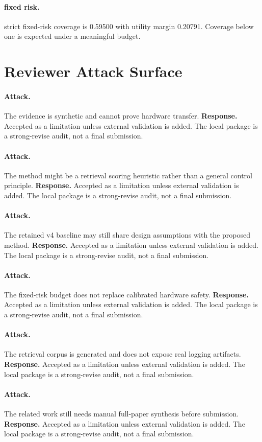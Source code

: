 \documentclass{article}
\begin{document}
\paragraph{fixed risk.} strict fixed-risk coverage is 0.59500 with utility margin 0.20791. Coverage below one is expected under a meaningful budget.
\clearpage
\section{Reviewer Attack Surface}
\paragraph{Attack.} The evidence is synthetic and cannot prove hardware transfer. \textbf{Response.} Accepted as a limitation unless external validation is added. The local package is a strong-revise audit, not a final submission.
\paragraph{Attack.} The method might be a retrieval scoring heuristic rather than a general control principle. \textbf{Response.} Accepted as a limitation unless external validation is added. The local package is a strong-revise audit, not a final submission.
\paragraph{Attack.} The retained v4 baseline may still share design assumptions with the proposed method. \textbf{Response.} Accepted as a limitation unless external validation is added. The local package is a strong-revise audit, not a final submission.
\paragraph{Attack.} The fixed-risk budget does not replace calibrated hardware safety. \textbf{Response.} Accepted as a limitation unless external validation is added. The local package is a strong-revise audit, not a final submission.
\paragraph{Attack.} The retrieval corpus is generated and does not expose real logging artifacts. \textbf{Response.} Accepted as a limitation unless external validation is added. The local package is a strong-revise audit, not a final submission.
\paragraph{Attack.} The related work still needs manual full-paper synthesis before submission. \textbf{Response.} Accepted as a limitation unless external validation is added. The local package is a strong-revise audit, not a final submission.
\clearpage
\end{document}
